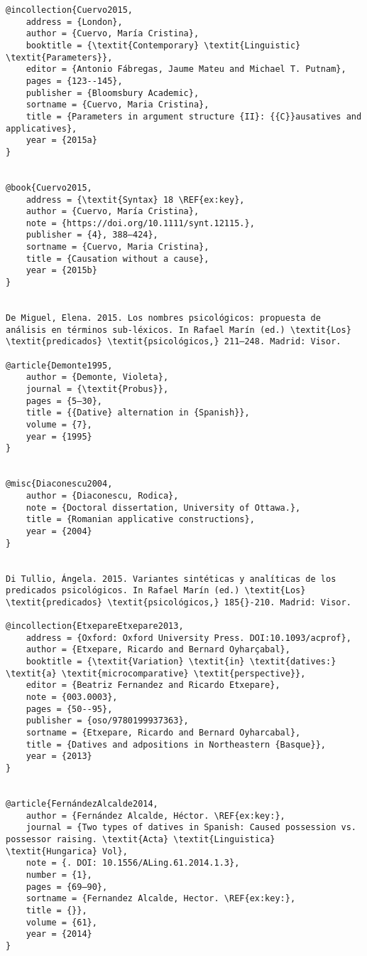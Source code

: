 \documentclass[output=paper,modfonts,nonflat]{langsci/langscibook}
\begin{document}
\begin{verbatim}
@incollection{Cuervo2015,
	address = {London},
	author = {Cuervo, María Cristina},
	booktitle = {\textit{Contemporary} \textit{Linguistic} \textit{Parameters}},
	editor = {Antonio Fábregas, Jaume Mateu and Michael T. Putnam},
	pages = {123--145},
	publisher = {Bloomsbury Academic},
	sortname = {Cuervo, Maria Cristina},
	title = {Parameters in argument structure {II}: {{C}}ausatives and applicatives},
	year = {2015a}
}


@book{Cuervo2015,
	address = {\textit{Syntax} 18 \REF{ex:key},
	author = {Cuervo, María Cristina},
	note = {https://doi.org/10.1111/synt.12115.},
	publisher = {4}, 388–424},
	sortname = {Cuervo, Maria Cristina},
	title = {Causation without a cause},
	year = {2015b}
}


De Miguel, Elena. 2015. Los nombres psicológicos: propuesta de análisis en términos sub-léxicos. In Rafael Marín (ed.) \textit{Los} \textit{predicados} \textit{psicológicos,} 211–248. Madrid: Visor.

@article{Demonte1995,
	author = {Demonte, Violeta},
	journal = {\textit{Probus}},
	pages = {5–30},
	title = {{Dative} alternation in {Spanish}},
	volume = {7},
	year = {1995}
}


@misc{Diaconescu2004,
	author = {Diaconescu, Rodica},
	note = {Doctoral dissertation, University of Ottawa.},
	title = {Romanian applicative constructions},
	year = {2004}
}


Di Tullio, Ángela. 2015. Variantes sintéticas y analíticas de los predicados psicológicos. In Rafael Marín (ed.) \textit{Los} \textit{predicados} \textit{psicológicos,} 185{}-210. Madrid: Visor.

@incollection{EtxepareEtxepare2013,
	address = {Oxford: Oxford University Press. DOI:10.1093/acprof},
	author = {Etxepare, Ricardo and Bernard Oyharçabal},
	booktitle = {\textit{Variation} \textit{in} \textit{datives:} \textit{a} \textit{microcomparative} \textit{perspective}},
	editor = {Beatriz Fernandez and Ricardo Etxepare},
	note = {003.0003},
	pages = {50--95},
	publisher = {oso/9780199937363},
	sortname = {Etxepare, Ricardo and Bernard Oyharcabal},
	title = {Datives and adpositions in Northeastern {Basque}},
	year = {2013}
}


@article{FernándezAlcalde2014,
	author = {Fernández Alcalde, Héctor. \REF{ex:key:},
	journal = {Two types of datives in Spanish: Caused possession vs. possessor raising. \textit{Acta} \textit{Linguistica} \textit{Hungarica} Vol},
	note = {. DOI: 10.1556/ALing.61.2014.1.3},
	number = {1},
	pages = {69–90},
	sortname = {Fernandez Alcalde, Hector. \REF{ex:key:},
	title = {}},
	volume = {61},
	year = {2014}
}



\end{verbatim}
\end{document}
